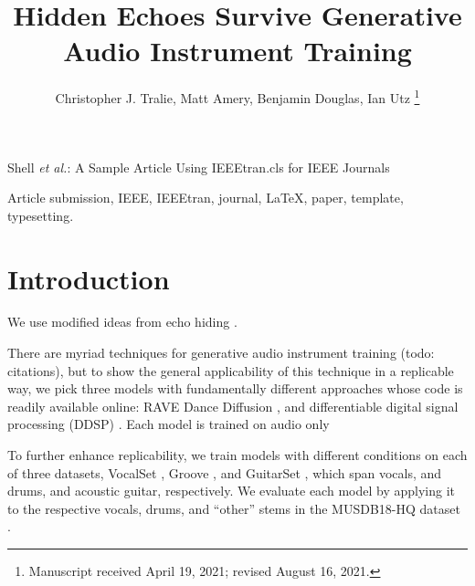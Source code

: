 \documentclass[lettersize,journal]{IEEEtran}
\begin{document}
\title{Hidden Echoes Survive Generative Audio Instrument Training}

\author{Christopher J. Tralie, Matt Amery, Benjamin Douglas, Ian Utz
\thanks{Manuscript received April 19, 2021; revised August 16, 2021.}}

%
{Shell \MakeLowercase{\textit{et al.}}: A Sample Article Using IEEEtran.cls for IEEE Journals}


\maketitle

\begin{abstract}



\end{abstract}

\begin{IEEEkeywords}
Article submission, IEEE, IEEEtran, journal, \LaTeX, paper, template, typesetting.
\end{IEEEkeywords}

\section{Introduction}

We use modified ideas from echo hiding \cite{gruhl1996echo}.

There are myriad techniques for generative audio instrument training (todo: citations), but to show the general applicability of this technique in a replicable way, we pick three models with fundamentally different approaches whose code is readily available online: RAVE \cite{caillon2021rave} Dance Diffusion \cite{evans2022dancediffusion}, and differentiable digital signal processing (DDSP) \cite{engelddsp}.  Each model is trained on audio only

To further enhance replicability, we train models with different conditions on each of three datasets, VocalSet \cite{wilkins2018vocalset}, Groove \cite{groove2019}, and GuitarSet \cite{xi2018guitarset}, which span vocals, and drums, and acoustic guitar, respectively.  We evaluate each model by applying it to the respective vocals, drums, and ``other'' stems in the MUSDB18-HQ dataset \cite{musdb18-hq}.
\end{document}

